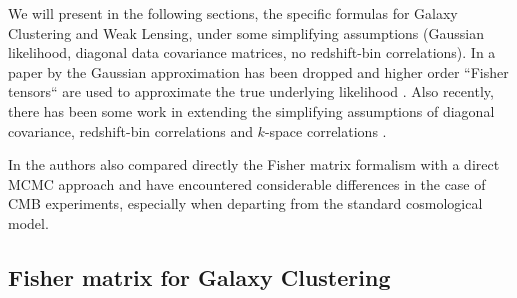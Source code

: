 We will present in the following sections, the specific formulas for Galaxy Clustering 
and Weak Lensing, under some simplifying assumptions (Gaussian likelihood,
diagonal data covariance matrices, no redshift-bin correlations).
In a paper by \cite{sellentin_breaking_2014} the Gaussian approximation has been 
dropped and higher order ``Fisher tensors`` are used to approximate the true underlying likelihood \cite{cite Sellentin more}.
Also recently, there has been some work in extending the simplifying assumptions of 
diagonal covariance, redshift-bin correlations and $k$-space correlations \cite{bailoni_improving_2016, Durrer, 
Amendola with Blot}.

In \cite{Khedekar, Majumdar} the authors also compared directly the Fisher matrix formalism with a direct MCMC approach
and have encountered considerable differences in the case of CMB experiments,
especially when departing from the standard cosmological model.


\subsection{Fisher matrix for Galaxy Clustering\label{sub:Fisher-Galaxy-Clustering}}

